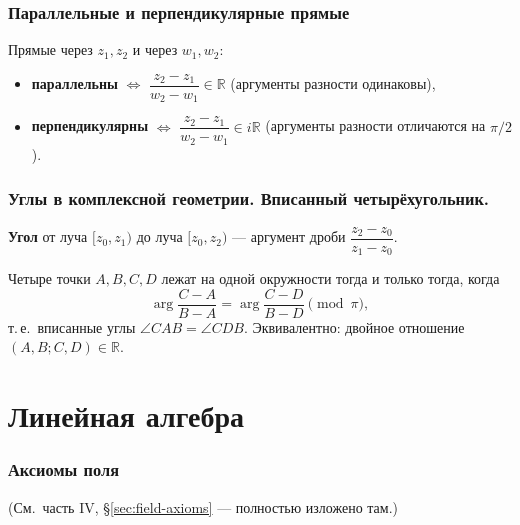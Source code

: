 \documentclass[12pt]{article}
\begin{document}
\section{Параллельные и перпендикулярные прямые}

\begin{theorem}
Прямые через $z_1,z_2$ и через $w_1,w_2$:
\begin{itemize}
\item \textbf{параллельны} $\iff$ $\dfrac{z_2-z_1}{w_2-w_1} \in \mathbb{R}$
      (аргументы разности одинаковы),
\item \textbf{перпендикулярны} $\iff$ $\dfrac{z_2-z_1}{w_2-w_1} \in i\mathbb{R}$
      (аргументы разности отличаются на $\pi/2$).
\end{itemize}
\end{theorem}

\section{Углы в комплексной геометрии. Вписанный четырёхугольник.}

\begin{definition}
\textbf{Угол} от луча $[z_0,z_1)$ до луча $[z_0,z_2)$ ---
аргумент дроби $\dfrac{z_2 - z_0}{z_1 - z_0}$.
\end{definition}

\begin{theorem}
Четыре точки $A,B,C,D$ лежат на одной окружности тогда и только тогда,
когда
\[
\arg\frac{C - A}{B - A} = \arg\frac{C - D}{B - D} \pmod{\pi},
\]
т.\,е.\ вписанные углы $\angle CAB = \angle CDB$.
Эквивалентно: двойное отношение $(A,B;C,D) \in \mathbb{R}$.
\end{theorem}

\part{Линейная алгебра}

\section{Аксиомы поля}

(См.~часть IV, \S\ref{sec:field-axioms} --- полностью изложено там.)
\end{document}
